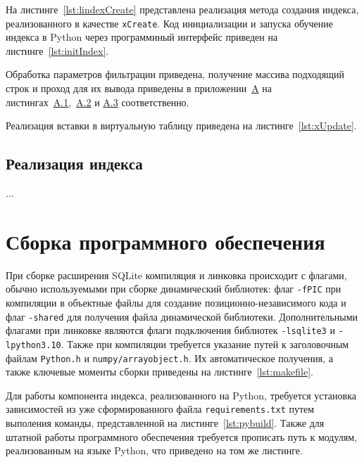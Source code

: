 На листинге~\ref{lst:lindexCreate} представлена реализация метода создания
индекса, реализованного в качестве \texttt{xCreate}. Код инициализации и запуска
обучение индекса в Python через программиный интерфейс приведен на
листинге~\ref{lst:initIndex}.



Обработка параметров фильтрации приведена, получение массива подходящий строк и
проход для их вывода приведены в приложении~\hyperref[add1]{A} на
листингах~\hyperref[lst:xBestIndex]{A.1},~\hyperref[lst:xFilter]{A.2} и
\hyperref[lst:xSearch]{A.3} соответственно.

Реализация вставки в виртуальную таблицу приведена на
листинге~\ref{lst:xUpdate}.


\subsection{Реализация индекса}

...

\section{Сборка программного обеспечения}

При сборке расширения SQLite компиляция и линковка происходит с флагами,
обычно используемыми при сборке динамический библиотек: флаг \texttt{-fPIC} при
компиляции в объектные файлы для создание позиционно-независимого кода и флаг
\texttt{-shared} для получения файла динамической библиотеки. Дополнительными
флагами при линковке являются флаги подключения библиотек \texttt{-lsqlite3} и
\texttt{-lpython3.10}. Также при компиляции требуется указание путей к
заголовочным файлам \texttt{Python.h} и \texttt{numpy/arrayobject.h}. Их
автоматическое получения, а также ключевые моменты сборки приведены на
листинге~\ref{lst:makefile}.


Для работы компонента индекса, реализованного на Python, требуется установка
зависимостей из уже сформированного файла \texttt{requirements.txt} путем
выполения команды, представленной на листинге~\ref{lst:pybuild}. Также для
штатной работы программного обеспечения требуется прописать путь к модулям,
реализованным на языке Python, что приведено на том же листинге.

